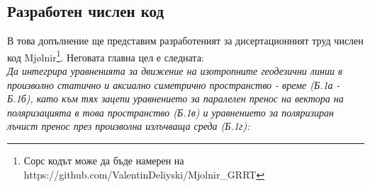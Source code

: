 
\begin{appendices}
	
	\section{Разработен числен код}

В това допълнение ще представим разработеният за дисертационният труд числен код Mjølnir\footnote{Сорс кодът може да бъде намерен на https://github.com/ValentinDeliyski/Mjolnir\_GRRT}. Неговата главна цел е следната: \\

\emph{Да интегрира уравненията за движение на изотропните геодезични линии в произволно статично и аксиално симетрично пространство - време (Б.1а - Б.1б), като към тях зацепи  уравнението за паралелен пренос на вектора на поляризацията в това пространство (Б.1в) и уравнението за поляризиран лъчист пренос през произволна излъчваща среда (Б.1г):}


\end{appendices}
